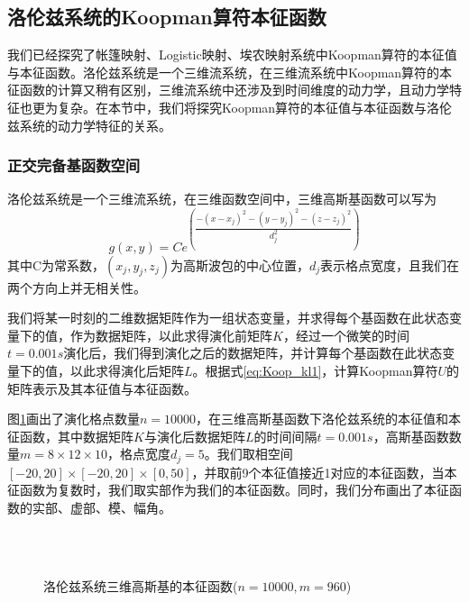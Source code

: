 \subsection{洛伦兹系统的Koopman算符本征函数}
我们已经探究了帐篷映射、Logistic映射、埃农映射系统中Koopman算符的本征值与本征函数。洛伦兹系统是一个三维流系统，在三维流系统中Koopman算符的本征函数的计算又稍有区别，三维流系统中还涉及到时间维度的动力学，且动力学特征也更为复杂。在本节中，我们将探究Koopman算符的本征值与本征函数与洛伦兹系统的动力学特征的关系。

\subsubsection{正交完备基函数空间}
洛伦兹系统是一个三维流系统，在三维函数空间中，三维高斯基函数可以写为
\begin{equation}
  g(x,y)=Ce^{({\dfrac{-(x-x_j)^2-(y-y_j)^2-(z-z_j)^2}{d_j^2}})}
\end{equation}
其中C为常系数，$(x_j,y_j,z_j)$为高斯波包的中心位置，$d_j$表示格点宽度，且我们在两个方向上并无相关性。

我们将某一时刻的二维数据矩阵作为一组状态变量，并求得每个基函数在此状态变量下的值，作为数据矩阵，以此求得演化前矩阵$K$，经过一个微笑的时间$t=0.001s$演化后，我们得到演化之后的数据矩阵，并计算每个基函数在此状态变量下的值，以此求得演化后矩阵$L$。根据式\eqref{eq:Koop_kl1}，计算Koopman算符$U$的矩阵表示及其本征值与本征函数。

图\ref{fig:lorenz_eig_gauss}画出了演化格点数量$n=10000$，在三维高斯基函数下洛伦兹系统的本征值和本征函数，其中数据矩阵$K$与演化后数据矩阵$L$的时间间隔$t=0.001s$，高斯基函数数量$m=8\times 12\times 10$，格点宽度$d_j=5$。我们取相空间$[-20,20]\times [-20,20]\times [0,50]$，并取前9个本征值接近1对应的本征函数，当本征函数为复数时，我们取实部作为我们的本征函数。同时，我们分布画出了本征函数的实部、虚部、模、幅角。
\begin{figure}
    \centering
    \\
    \\
    \caption{洛伦兹系统三维高斯基的本征函数($n=10000,m=960$)}\label{fig:lorenz_eig_gauss}
\end{figure}

